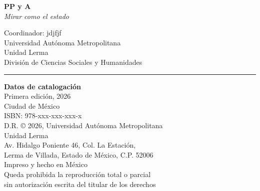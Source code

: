 \begin{titlepage}
    \thispagestyle{empty}
    \pagestyle{empty}
    
    \vspace*{2cm}
    
    \begin{center}
        \textbf{PP y A} \\
        \textit{Mirar como el estado} \\
        \vspace{0.5cm}
        
        \small
        Coordinador: jdjfjf \\
        Universidad Autónoma Metropolitana \\
        Unidad Lerma \\
        División de Ciencias Sociales y Humanidades \\
        \vspace{2cm}
        
        \rule{0.6\textwidth}{0.4pt}
        \vspace{0.5cm}
        
        \small
        \textbf{Datos de catalogación} \\
        \vspace{0.3cm}
        Primera edición, 2026 \\
        Ciudad de México \\
        \vspace{0.3cm}
        ISBN: 978-xxx-xxx-xxx-x \\
        D.R. © 2026, Universidad Autónoma Metropolitana \\
        Unidad Lerma \\
        Av. Hidalgo Poniente 46, Col. La Estación, \\
        Lerma de Villada, Estado de México, C.P. 52006 \\
        \vspace{0.3cm}
        Impreso y hecho en México \\
        \vspace{0.3cm}
        Queda prohibida la reproducción total o parcial \\
        sin autorización escrita del titular de los derechos
    \end{center}
\end{titlepage}

\pagestyle{plain}
\setcounter{page}{1}  %